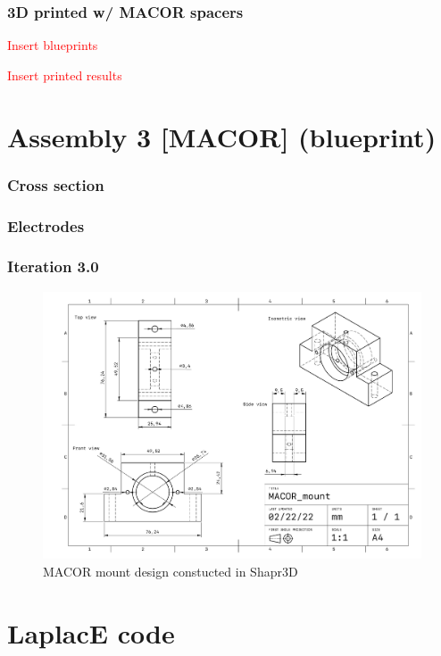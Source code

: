 \subsubsection{3D printed w/ MACOR spacers}

\textcolor{red}{Insert blueprints}

\textcolor{red}{Insert printed results}

\newpage

\section{Assembly 3 [MACOR] (blueprint)}
\subsubsection{Cross section}
\subsubsection{Electrodes}

\subsubsection{Iteration 3.0}
\begin{figure}[H]
\includegraphics[width=\textwidth]{figs/ALGAAS/assemblies/assembly3/MACOR_mount.pdf}
\caption{MACOR mount design constucted in Shapr3D}
\label{fig:macormountdesign}
\end{figure}

\mbox{}
\vfill

\section{LaplacE code}

